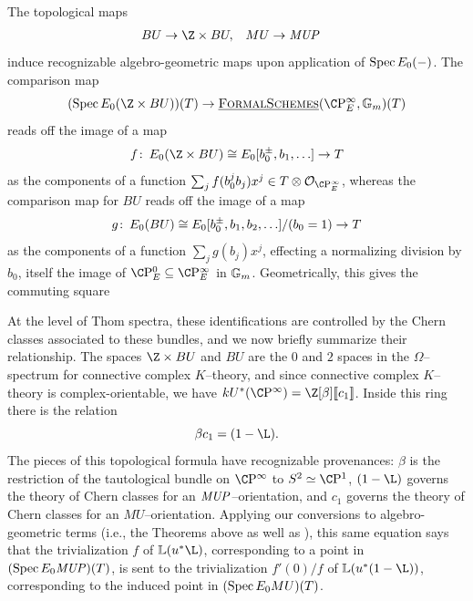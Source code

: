 \begin{remark}\label{BUtoBUZ}
The topological maps
\begin{align*}
BU & \to \Z \times BU, &
MU & \to \MUP
\end{align*}
induce recognizable algebro-geometric maps upon application of \(\operatorname{Spec} E_0(-)\).
The comparison map \[(\Spec E_0(\Z \times BU))(T) \to \InternalHom{FormalSchemes}(\CP^\infty_E, \Gm)(T)\] reads off the image of a map \[f\co E_0(\Z \times BU) \cong E_0[b_0^\pm, b_1, \ldots] \to T\] as the components of a function \(\sum_j f(b_0^j b_j) x^j \in T \otimes \sheaf O_{\CP^\infty_E}\), whereas the comparison map for \(BU\) reads off the image of a map \[g\colon\thinspace E_0(BU) \cong E_0[b_0^\pm, b_1, b_2, \ldots] / (b_0 = 1) \to T\] as the components of a function \(\sum_j g(b_j)x^j\), effecting a normalizing division by \(b_0\), itself the image of \(\CP^0_E \subseteq \CP^\infty_E\) in \(\mathbb G_m\).
Geometrically, this gives the commuting square
\begin{center}
\end{center}

At the level of Thom spectra, these identifications are controlled by the Chern classes associated to these bundles, and we now briefly summarize their relationship.
The spaces \(\Z \times BU\) and \(BU\) are the \(0\){\th} and \(2\){\nd} spaces in the \(\Omega\)--spectrum for connective complex \(K\)--theory, and since connective complex \(K\)--theory is complex-orientable, we have \(kU^*(\CP^\infty) = \Z[\beta]\ps{c_1}\).
Inside this ring there is the relation \[\beta c_1 = (1 - \L).\]
The pieces of this topological formula have recognizable provenances: \(\beta\) is the restriction of the tautological bundle on \(\CP^\infty\) to \(S^2 \simeq \CP^1\), \((1 - \L)\) governs the theory of Chern classes for an \(\mathit{MUP}\)--orientation, and \(c_1\) governs the theory of Chern classes for an \(MU\)--orientation.
Applying our conversions to algebro-geometric terms (i.e., the Theorems above as well as ), this same equation says that the trivialization \(f\) of \(\ThomSheaf{u^* \L}\), corresponding to a point in \((\operatorname{Spec} E_0 \mathit{MUP})(T)\), is sent to the trivialization \(f'(0) / f\) of \(\ThomSheaf{u^*(1 - \L)}\), corresponding to the induced point in \((\operatorname{Spec} E_0 MU)(T)\).
\end{remark}


